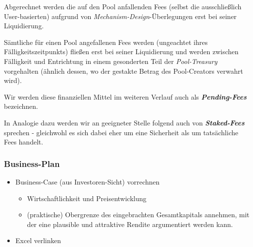 Abgerechnet werden die auf den Pool anfallenden Fees (selbst die ausschließlich User-basierten) aufgrund von \textit{Mechanism-Design}-Überlegungen erst bei seiner Liquidierung.

\vspace{0.3cm}

\begin{Praemisse}[Abrechnung]

Sämtliche für einen Pool angefallenen Fees werden (ungeachtet ihres Fälligkeitszeit\-punkts) fließen erst bei seiner Liquidierung und werden zwischen Fälligkeit und Entrichtung in einem gesonderten Teil der \textit{Pool-Treasury} vorgehalten (ähnlich dessen, wo der gestakte Betrag des Pool-Creators verwahrt wird).

\vspace{0.2cm}

Wir werden diese finanziellen Mittel im weiteren Verlauf auch als \textbf{\textit{Pending-Fees}} bezeichnen.

\vspace{0.2cm}

In Analogie dazu werden wir an geeigneter Stelle folgend auch von \textbf{\textit{Staked-Fees}} sprechen - gleichwohl es sich dabei eher um eine Sicherheit als um tatsächliche Fees handelt.

\end{Praemisse}

\vspace{0.5cm}


\vspace{0.5cm}


\subsubsection{Business-Plan}
\vspace{0.2cm}


\begin{itemize} 
	\item Business-Case (aus Investoren-Sicht) vorrechnen
	\begin{itemize}
		\item Wirtschaftlichkeit und Preisentwicklung
		\item (praktische) Obergrenze des eingebrachten Gesamtkapitals annehmen, mit der eine plausible und attraktive Rendite argumentiert werden kann.
	\end{itemize}
	\item Excel verlinken
\end{itemize}

